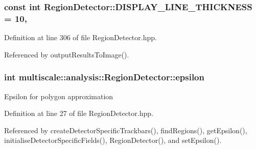 \hypertarget{classmultiscale_1_1analysis_1_1RegionDetector_aee6fbc641e8a6a85b1d877f9b4c6c6c3}{
\subsubsection[{D\-I\-S\-P\-L\-A\-Y\-\_\-\-L\-I\-N\-E\-\_\-\-T\-H\-I\-C\-K\-N\-E\-S\-S}]{\setlength{\rightskip}{0pt plus 5cm}const int Region\-Detector\-::\-D\-I\-S\-P\-L\-A\-Y\-\_\-\-L\-I\-N\-E\-\_\-\-T\-H\-I\-C\-K\-N\-E\-S\-S = 10\hspace{0.3cm}{\ttfamily [static]}, {\ttfamily [private]}}}\label{classmultiscale_1_1analysis_1_1RegionDetector_aee6fbc641e8a6a85b1d877f9b4c6c6c3}


Definition at line 306 of file Region\-Detector.\-hpp.



Referenced by output\-Results\-To\-Image().

\hypertarget{classmultiscale_1_1analysis_1_1RegionDetector_acf21910fadd7c6ef2810743a78a0aeb9}{
\subsubsection[{epsilon}]{\setlength{\rightskip}{0pt plus 5cm}int multiscale\-::analysis\-::\-Region\-Detector\-::epsilon\hspace{0.3cm}{\ttfamily [private]}}}\label{classmultiscale_1_1analysis_1_1RegionDetector_acf21910fadd7c6ef2810743a78a0aeb9}
Epsilon for polygon approximation 

Definition at line 27 of file Region\-Detector.\-hpp.



Referenced by create\-Detector\-Specific\-Trackbars(), find\-Regions(), get\-Epsilon(), initialise\-Detector\-Specific\-Fields(), Region\-Detector(), and set\-Epsilon().

